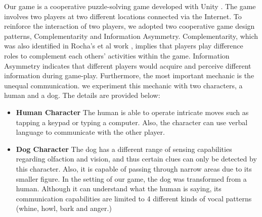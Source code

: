 \documentclass{sigchi}
\begin{document}
Our game is a cooperative puzzle-solving game developed with Unity \cite{Unity}. The game involves two players at two different locations connected via the Internet. To reinforce the interaction of two players, we adopted two cooperative game design patterns, Complementarity and Information Asymmetry. Complementarity, which was also identified in Rocha's et al work \cite{CG4}, implies that players play difference roles to complement each others' activities within the game. Information Asymmetry indicates that different players would acquire and perceive different information during game-play. Furthermore, the most important mechanic is the unequal communication. we experiment this mechanic with two characters, a human and a dog. The details are provided below:
\begin{itemize}
\item \textbf{Human Character}\newline
The human is able to operate intricate moves such as tapping a keypad or typing a computer. Also, the character can use verbal language to communicate with the other player.
\item \textbf{Dog Character}\newline
The dog has a different range of sensing capabilities regarding olfaction and vision, and thus certain clues can only be detected by this character. Also, it is capable of passing through narrow areas due to its smaller figure. In the setting of our game, the dog was transformed from a human. Although it can understand what the human is saying, its communication capabilities are limited to 4 different kinds of vocal patterns (whine, howl, bark and anger.)
\end{itemize}
\end{document}
